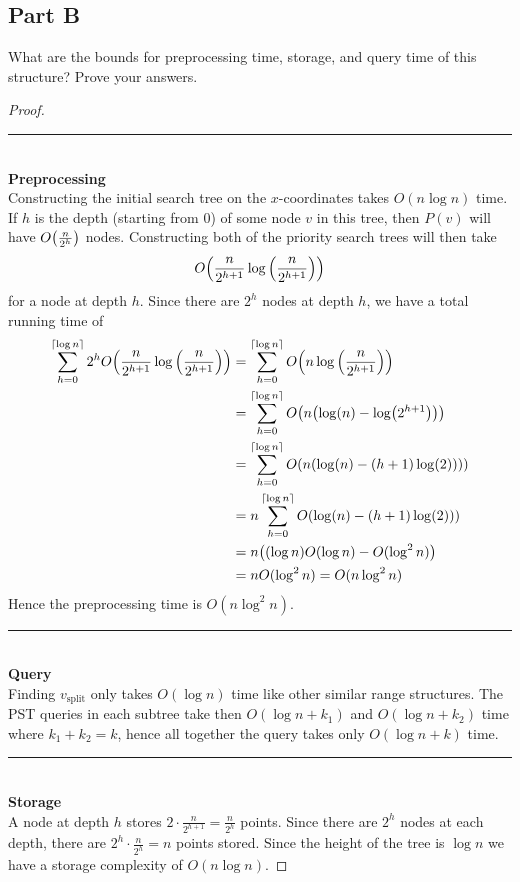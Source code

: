 \documentclass[12pt]{extarticle}
\begin{document}
\subsection*{Part B}
What are the bounds for preprocessing time, storage, and query time of this structure? Prove your answers.

\begin{proof}
    \hfill\\
    \rule{\textwidth}{1pt}\\
    \textbf{Preprocessing} \\
    Constructing the initial search tree on the $x$-coordinates takes $O(n \log n)$ time. If $h$ is the depth (starting from $0$) of some node $v$ in this tree, then $P(v)$ will have $O\qty(\frac{n}{2^h})$ nodes. Constructing both of the priority search trees will then take 
    \[
        O\qty(\frac{n}{2^{h+1}} \log\qty(\frac{n}{2^{h+1}}))
    \]
    for a node at depth $h$. Since there are $2^{h}$ nodes at depth $h$, we have a total running time of
    \begin{align*}
        \sum_{h = 0}^{\lceil \log n \rceil} 2^{h} O\qty(\frac{n}{2^{h+1}} \log\qty(\frac{n}{2^{h+1}})) &= \sum_{h = 0}^{\lceil \log n \rceil} O\qty(n \log\qty(\frac{n}{2^{h+1}})) \\
                                                                                                         &= \sum_{h = 0}^{\lceil \log n \rceil} O\qty(n \qty(\log(n) - \log(2^{h+1}))) \\
                                                                                                         &= \sum_{h = 0}^{\lceil \log n \rceil} O\qty(n \qty(\log(n) - (h+1)\log(2)))) \\
                                                                                                         &= n\sum_{h = 0}^{\lceil \log n \rceil} O\qty(\log(n) - (h+1)\log(2))) \\
                                                                                                         &= n \qty((\log n)O(\log n) - O(\log^2 n)) \\
                                                                                                         &= n O(\log^2 n) = O(n \log^2 n)
    \end{align*}
    Hence the preprocessing time is $O(n \log^2 n)$.
    \\\noindent \rule{\textwidth}{1pt}\\
    \textbf{Query} \\
    Finding $v_{\text{split}}$ only takes $O(\log n)$ time like other similar range structures. The PST queries in each subtree take then $O(\log n + k_1)$ and $O(\log n + k_2)$ time where $k_1 + k_2 = k$, hence all together the query takes only $O(\log n + k)$ time.
    \\\noindent \rule{\textwidth}{1pt}\\
    \textbf{Storage} \\
    A node at depth $h$ stores $2 \cdot \frac{n}{2^{h+1}} = \frac{n}{2^h}$ points. Since there are $2^{h}$ nodes at each depth, there are $2^{h} \cdot \frac{n}{2^h} = n$ points stored. Since the height of the tree is $\log n$ we have a storage complexity of $O(n \log n)$.
\end{proof}
\end{document}
